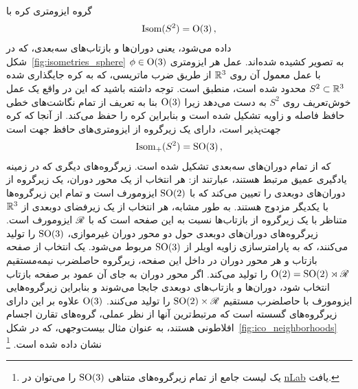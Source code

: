 گروه ایزومتری کره با
\begin{align}
    \operatorname{Isom}(S^2) = \operatorname{O}(3) \,,
\end{align}
داده می‌شود، یعنی دوران‌ها و بازتاب‌های سه‌بعدی، که در شکل~\ref{fig:isometries_sphere} به تصویر کشیده شده‌اند.
عمل هر ایزومتری $\phi\in\operatorname{O}(3)$ با عمل معمول آن روی $\mathbb{R}^3$ از طریق ضرب ماتریسی، که به کره جایگذاری شده $S^2 \subset \mathbb{R}^3$ محدود شده است، منطبق است.
توجه داشته باشید که این در واقع یک عمل خوش‌تعریف روی $S^2$ به دست می‌دهد زیرا $\operatorname{O}(3)$ بنا به تعریف از تمام نگاشت‌های خطی حافظ فاصله و زاویه تشکیل شده است و بنابراین کره را حفظ می‌کند.
از آنجا که کره جهت‌پذیر است، دارای یک زیرگروه از ایزومتری‌های حافظ جهت است
\begin{align}
    \operatorname{Isom}_+(S^2) = \operatorname{SO}(3) \,,
\end{align}
که از تمام دوران‌های سه‌بعدی تشکیل شده است.
زیرگروه‌های دیگری که در زمینه یادگیری عمیق مرتبط هستند، عبارتند از:
هر انتخاب از یک محور دوران، یک زیرگروه از دوران‌های دوبعدی را تعیین می‌کند که با $\operatorname{SO}(2)$ ایزومورف است و تمام این زیرگروه‌ها با یکدیگر مزدوج هستند.
به طور مشابه، هر انتخاب از یک زیرفضای دوبعدی از $\mathbb{R}^3$ متناظر با یک زیرگروه از بازتاب‌ها نسبت به این صفحه است که با $\mathscr{R}$ ایزومورف است.
زیرگروه‌های دوران‌های دوبعدی حول دو محور دوران غیرموازی، $\operatorname{SO}(3)$ را تولید می‌کنند، که به پارامترسازی زاویه اویلر از $\operatorname{SO}(3)$ مربوط می‌شود.
یک انتخاب از صفحه بازتاب و هر محور دوران در داخل این صفحه، زیرگروه حاصلضرب نیمه‌مستقیم $\operatorname{O}(2) = \operatorname{SO}(2) \rtimes \mathscr{R}$ را تولید می‌کند.
اگر محور دوران به جای آن عمود بر صفحه بازتاب انتخاب شود، دوران‌ها و بازتاب‌های دوبعدی جابجا می‌شوند و بنابراین زیرگروه‌هایی ایزومورف با حاصلضرب مستقیم $\operatorname{SO}(2) \times \mathscr{R}$ را تولید می‌کنند.
$\operatorname{O}(3)$ علاوه بر این دارای زیرگروه‌های گسسته است که مرتبط‌ترین آنها از نظر عملی، گروه‌های تقارن اجسام افلاطونی هستند، به عنوان مثال بیست‌وجهی، که در شکل~\ref{fig:ico_neighborhoods} نشان داده شده است.%
\footnote{
    یک لیست جامع از تمام زیرگروه‌های متناهی $\operatorname{SO}(3)$ را می‌توان در \href{https://ncatlab.org/nlab/show/SO\%283\%29\#finite_subgroups}{nLab} یافت.
}


